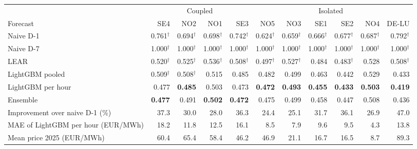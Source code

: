 \begin{tabular}{lrrrrrrrrrr}
\toprule
 & \multicolumn{4}{c}{Coupled} & \multicolumn{1}{c}{} & \multicolumn{4}{c}{Isolated} & \multicolumn{1}{c}{} \\
\cmidrule(lr){2-5} \cmidrule(lr){7-10}
Forecast & SE4 & NO2 & NO1 & SE3 & NO5 & NO3 & SE1 & SE2 & NO4 & DE-LU \\
\midrule
Naive D-1 & 0.761$^{\dagger}$ & 0.694$^{\dagger}$ & 0.698$^{\dagger}$ & 0.742$^{\dagger}$ & 0.624$^{\dagger}$ & 0.659$^{\dagger}$ & 0.666$^{\dagger}$ & 0.677$^{\dagger}$ & 0.687$^{\dagger}$ & 0.792$^{\dagger}$ \\
Naive D-7 & 1.000$^{\dagger}$ & 1.000$^{\dagger}$ & 1.000$^{\dagger}$ & 1.000$^{\dagger}$ & 1.000$^{\dagger}$ & 1.000$^{\dagger}$ & 1.000$^{\dagger}$ & 1.000$^{\dagger}$ & 1.000$^{\dagger}$ & 1.000$^{\dagger}$ \\
LEAR & 0.520$^{\dagger}$ & 0.525$^{\dagger}$ & 0.536$^{\dagger}$ & 0.508$^{\dagger}$ & 0.497$^{\dagger}$ & 0.527$^{\dagger}$ & 0.484 & 0.483$^{\dagger}$ & 0.528 & 0.508$^{\dagger}$ \\
LightGBM pooled & 0.509$^{\dagger}$ & 0.508$^{\dagger}$ & 0.515 & 0.485 & 0.482 & 0.499 & 0.463 & 0.442 & 0.529 & 0.433 \\
LightGBM per hour & 0.477 & \textbf{0.485} & 0.503 & 0.473 & \textbf{0.472} & \textbf{0.493} & \textbf{0.455} & \textbf{0.433} & \textbf{0.503} & \textbf{0.419} \\
Ensemble & \textbf{0.477} & 0.491 & \textbf{0.502} & \textbf{0.472} & 0.475 & 0.499 & 0.458 & 0.447 & 0.508 & 0.436 \\
\midrule
Improvement over naive D-1 (\%) & 37.3 & 30.0 & 28.0 & 36.3 & 24.4 & 25.1 & 31.7 & 36.1 & 26.9 & 47.0 \\
MAE of LightGBM per hour (EUR/MWh) & 18.2 & 11.8 & 12.5 & 16.1 & 8.5 & 7.9 & 9.6 & 9.5 & 4.3 & 13.8 \\
Mean price 2025 (EUR/MWh) & 60.4 & 65.4 & 58.4 & 46.2 & 46.9 & 21.1 & 16.7 & 16.5 & 8.7 & 89.3 \\
\bottomrule
\end{tabular}
